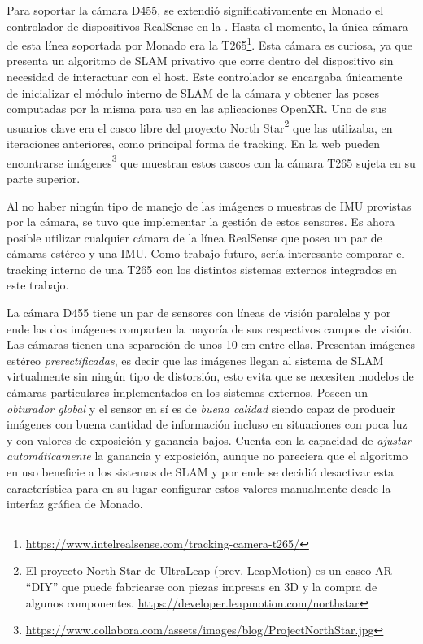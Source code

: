 \documentclass[ twoside,openright,titlepage,numbers=noenddot,%
                headinclude,footinclude,cleardoublepage=empty,abstract=on,
                BCOR=-5mm,paper=a4,fontsize=11pt
                ]{scrreprt}
\begin{document}
Para soportar la cámara D455, se extendió significativamente en Monado
el controlador de dispositivos RealSense en la .
Hasta el momento, la única cámara de esta línea soportada por Monado era
la T265\footnote{\url{https://www.intelrealsense.com/tracking-camera-t265/}}.
Esta cámara es curiosa, ya que presenta un algoritmo de SLAM privativo
que corre dentro del dispositivo sin necesidad de interactuar con el
host. Este controlador se encargaba únicamente de inicializar el módulo
interno de SLAM de la cámara y obtener las poses computadas por la misma
para uso en las aplicaciones OpenXR. Uno de sus usuarios clave era el
casco libre del proyecto North Star\footnote{El proyecto North Star de
  UltraLeap (prev. LeapMotion) es un casco AR ``DIY'' que puede
  fabricarse con piezas impresas en 3D y la compra de algunos
  componentes. \url{https://developer.leapmotion.com/northstar}} que las
utilizaba, en iteraciones anteriores, como principal forma de tracking.
En la web pueden encontrarse imágenes\footnote{\url{https://www.collabora.com/assets/images/blog/ProjectNorthStar.jpg}}
que muestran estos cascos con la cámara T265 sujeta en su parte
superior.

Al no haber ningún tipo de manejo de las imágenes o muestras de IMU
provistas por la cámara, se tuvo que implementar la gestión de estos
sensores. Es ahora posible utilizar cualquier cámara de la línea
RealSense que posea un par de cámaras estéreo y una IMU. Como trabajo
futuro, sería interesante comparar el tracking interno de una T265 con
los distintos sistemas externos integrados en este trabajo.

La cámara D455 tiene un par de sensores con líneas de visión paralelas y
por ende las dos imágenes comparten la mayoría de sus respectivos campos
de visión. Las cámaras tienen una separación de unos 10 cm entre ellas.
Presentan imágenes estéreo \emph{prerectificadas}, es decir que las
imágenes llegan al sistema de SLAM virtualmente sin ningún tipo de
distorsión, esto evita que se necesiten modelos de cámaras particulares
implementados en los sistemas externos. Poseen un \emph{obturador
global} y el sensor en sí es de \emph{buena calidad} siendo capaz de
producir imágenes con buena cantidad de información incluso en
situaciones con poca luz y con valores de exposición y ganancia bajos.
Cuenta con la capacidad de \emph{ajustar automáticamente} la ganancia y
exposición, aunque no pareciera que el algoritmo en uso beneficie a los
sistemas de SLAM y por ende se decidió desactivar esta característica
para en su lugar configurar estos valores manualmente desde la interfaz
gráfica de Monado.
\end{document}
